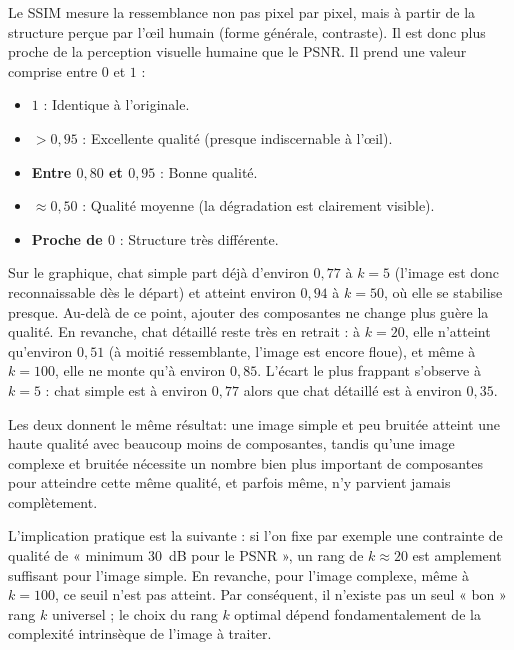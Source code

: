 \documentclass[12pt]{report}
\begin{document}
\vspace{0.4cm}
\clearpage

\noindent Le SSIM mesure la ressemblance non pas pixel par pixel, mais à partir de la structure perçue par l'œil humain (forme générale, contraste). Il est donc plus proche de la perception visuelle humaine que le PSNR. Il prend une valeur comprise entre $0$ et $1$ :
\begin{itemize}
    \item \textbf{$1$} : Identique à l'originale.
    \item \textbf{$> 0{,}95$} : Excellente qualité (presque indiscernable à l'œil).
    \item \textbf{Entre $0{,}80$ et $0{,}95$} : Bonne qualité.
    \item \textbf{$\approx 0{,}50$} : Qualité moyenne (la dégradation est clairement visible).
    \item \textbf{Proche de $0$} : Structure très différente.
\end{itemize}

\noindent Sur le graphique, chat simple part déjà d'environ $0{,}77$ à $k=5$ (l'image est donc reconnaissable dès le départ) et atteint environ $0{,}94$ à $k=50$, où elle se stabilise presque. Au-delà de ce point, ajouter des composantes ne change plus guère la qualité. En revanche, chat détaillé reste très en retrait : à $k=20$, elle n'atteint qu'environ $0{,}51$ (à moitié ressemblante, l'image est encore floue), et même à $k=100$, elle ne monte qu'à environ $0{,}85$. L'écart le plus frappant s'observe à $k=5$ : chat simple est à environ $0{,}77$ alors que chat détaillé est à environ $0{,}35$.

\vspace{0.4cm}

\noindent Les deux donnent le même résultat: une image simple et peu bruitée atteint une haute qualité avec beaucoup moins de composantes, tandis qu'une image complexe et bruitée nécessite un nombre bien plus important de composantes pour atteindre cette même qualité, et parfois même, n'y parvient jamais complètement.

L'implication pratique est la suivante : si l'on fixe par exemple une contrainte de qualité de « minimum $30$~dB pour le PSNR », un rang de $k \approx 20$ est amplement suffisant pour l'image simple. En revanche, pour l'image complexe, même à $k=100$, ce seuil n'est pas atteint. Par conséquent, il n'existe pas un seul « bon » rang $k$ universel ; le choix du rang $k$ optimal dépend fondamentalement de la complexité intrinsèque de l'image à traiter.
\vspace{0.3cm}
\end{document}
